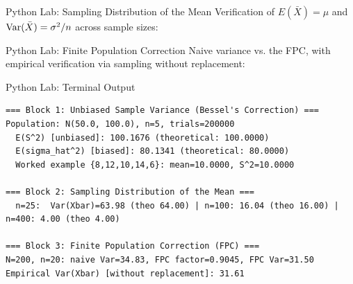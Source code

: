 \documentclass[aspectratio=169,xcolor={dvipsnames,table}]{beamer}
\begin{document}
\begin{frame}[fragile]{Python Lab: Sampling Distribution of the Mean}
	\vspace{-0.05cm}
	\scriptsize
	Verification of $E(\bar{X})=\mu$ and $\operatorname{Var}(\bar{X})=\sigma^2/n$ across sample sizes:
	{
	}
\end{frame}

\begin{frame}[fragile]{Python Lab: Finite Population Correction}
	\vspace{-0.05cm}
	\scriptsize
	Naive variance vs. the FPC, with empirical verification via sampling without replacement:
	{
	}
\end{frame}

\begin{frame}[fragile]{Python Lab: Terminal Output}
	\vspace{-0.1cm}
	\begin{block}{}
		\fontsize{4pt}{5pt}\selectfont
		\begin{verbatim}
=== Block 1: Unbiased Sample Variance (Bessel's Correction) ===
Population: N(50.0, 100.0), n=5, trials=200000
  E(S^2) [unbiased]: 100.1676 (theoretical: 100.0000)
  E(sigma_hat^2) [biased]: 80.1341 (theoretical: 80.0000)
  Worked example {8,12,10,14,6}: mean=10.0000, S^2=10.0000

=== Block 2: Sampling Distribution of the Mean ===
  n=25:  Var(Xbar)=63.98 (theo 64.00) | n=100: 16.04 (theo 16.00) | n=400: 4.00 (theo 4.00)

=== Block 3: Finite Population Correction (FPC) ===
N=200, n=20: naive Var=34.83, FPC factor=0.9045, FPC Var=31.50
Empirical Var(Xbar) [without replacement]: 31.61
		\end{verbatim}
	\end{block}
\end{frame}
\end{document}
